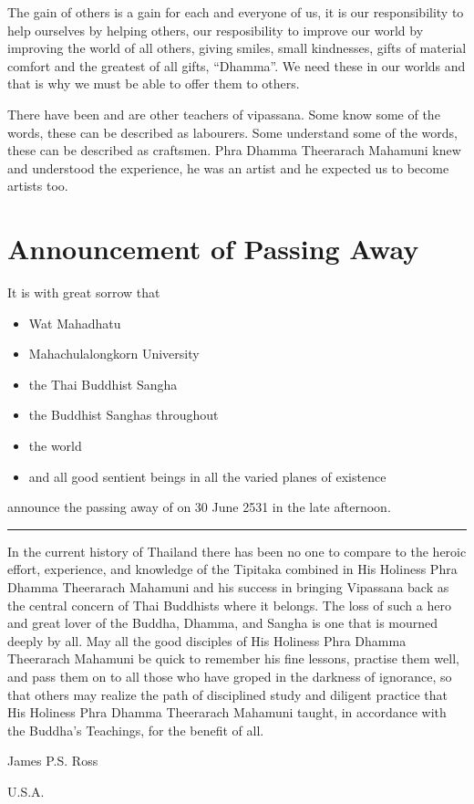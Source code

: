 \documentclass[a5paper,10pt,english]{book}
\begin{document}
\sphinxAtStartPar
The gain of others is a gain for each and everyone of us, it is our responsibility to help ourselves by helping others, our resposibility to improve our world by improving the world of all others, giving smiles, small kindnesses, gifts of material comfort and the greatest of all gifts, “Dhamma”. We need these in our worlds and that is why we must be able to offer them to others.

\sphinxAtStartPar
There have been and are other teachers of vipassana. Some know some of the words, these can be described as labourers. Some understand some of the words, these can be described as craftsmen. Phra Dhamma Theerarach Mahamuni knew and understood the experience, he was an artist and he expected us to become artists too.

\sphinxstepscope


\chapter{Announcement of Passing Away}
\label{\detokenize{death:announcement-of-passing-away}}\label{\detokenize{death::doc}}
\sphinxAtStartPar
It is with great sorrow that
\begin{itemize}
\item {} 
\sphinxAtStartPar
Wat Mahadhatu

\item {} 
\sphinxAtStartPar
Mahachulalongkorn University

\item {} 
\sphinxAtStartPar
the Thai Buddhist Sangha

\item {} 
\sphinxAtStartPar
the Buddhist Sanghas throughout

\item {} 
\sphinxAtStartPar
the world

\item {} 
\sphinxAtStartPar
and all good sentient beings in all the varied planes of existence

\end{itemize}

\sphinxAtStartPar
announce the passing away of  on 30 June 2531 in the late afternoon.


\bigskip\hrule\bigskip


\sphinxAtStartPar
In the current history of Thailand there has been no one to compare to the heroic effort, experience, and knowledge of the Tipitaka combined in His Holiness Phra Dhamma Theerarach Mahamuni and his success in bringing Vipassana back as the central concern of Thai Buddhists where it belongs. The loss of such a hero and great lover of the Buddha, Dhamma, and Sangha is one that is mourned deeply by all. May all the good disciples of His Holiness Phra Dhamma Theerarach Mahamuni be quick to remember his fine lessons, practise them well, and pass them on to all those who have groped in the darkness of ignorance, so that others may realize the path of disciplined study and diligent practice that His Holiness Phra Dhamma Theerarach Mahamuni taught, in accordance with the Buddha’s Teachings, for the benefit of all.

\begin{DUlineblock}{0em}
\item[] James P.S. Ross
\item[] U.S.A.
\end{DUlineblock}



\renewcommand{\indexname}{Index}
\printindex
\end{document}
